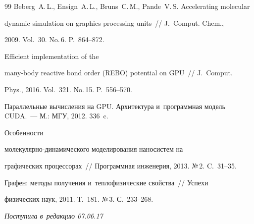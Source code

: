 {{{\begin{thebibliography}{99}
{Beberg~A.\,L., Ensign~A.\,L., Bruns~C.\,M., Pande~V.\,S.} Accelerating molecular 

dynamic simulation on graphics processing units~/\!\!/ J.~Comput. Chem., 

2009. Vol.~30. No.\,6. P.~864--872.


 Efficient implementation of the 

many-body reactive bond order (REBO) potential on GPU~/\!\!/ J.~Comput.

Phys., 2016. Vol.~321. No.\,15. P.~556--570.



Параллельные вычисления на GPU. Архитектура и~программная модель CUDA.~--- М.: МГУ, 2012. 336~c.


 Особенности  

мо\-ле\-ку\-ляр\-но-ди\-на\-ми\-че\-ско\-го моделирования наносистем на 

графических процессорах~/\!\!/ Программная инженерия, 2013. №\,2. C.~31--35.



Графен: методы получения и~теплофизические свойства~/\!\!/ Успехи 

физических наук, 2011. Т.~181. №\,3. С.~233--268.

        \end{thebibliography}

} }





\vspace*{-3pt}



\hfill{\small\textit{Поступила в~редакцию 07.06.17}}












}
